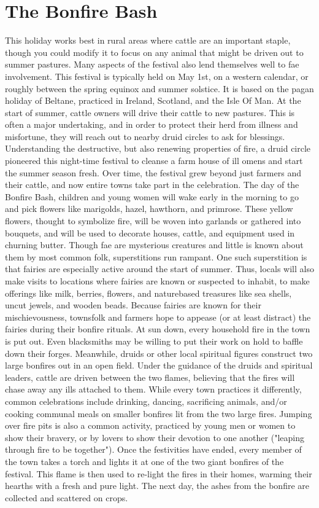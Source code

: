 \documentclass[10pt,a4paper,twoside,bg=print,twocolumn,openany,nodeprecatedcode]{dndbook}
\begin{document}
\section{The Bonfire Bash}
This holiday works best in rural areas where cattle are an important staple, though you could modify it to focus on any animal that might be driven out to summer pastures. Many aspects of the festival also lend themselves well to fae involvement. This festival is typically held on May 1st, on a western calendar, or roughly between the spring equinox and summer solstice. It is based on the pagan holiday of Beltane, practiced in Ireland, Scotland, and the Isle Of Man.
At the start of summer, cattle owners will drive their cattle to new pastures. This is often a major undertaking, and in order to protect their herd from illness and misfortune, they will reach out to nearby druid circles to ask for blessings. Understanding the destructive, but also renewing properties of fire, a druid circle pioneered this night-time festival to cleanse a farm house of ill omens and start the summer season fresh. Over time, the festival grew beyond just farmers and their cattle, and now entire towns take part in the celebration.
The day of the Bonfire Bash, children and young women will wake early in the morning to go and pick flowers like marigolds, hazel, hawthorn, and primrose. These yellow flowers, thought to symbolize fire, will be woven into garlands or gathered into bouquets, and will be used to decorate houses, cattle, and equipment used in churning butter.
Though fae are mysterious creatures and little is known about them by most common folk, superstitions run rampant. One such superstition is that fairies are especially active around the start of summer. Thus, locals will also make visits to locations where fairies are known or suspected to inhabit, to make offerings like milk, berries, flowers, and naturebased treasures like sea shells, uncut jewels, and wooden beads. Because fairies are known for their mischievousness, townsfolk and farmers hope to appease (or at least distract) the fairies during their bonfire rituals.
At sun down, every household fire in the town is put out. Even blacksmiths may be willing to put their work on hold to baffle down their forges. Meanwhile, druids or other local spiritual figures construct two large bonfires out in an open field. Under the guidance of the druids and spiritual leaders, cattle are driven between the two flames, believing that the fires will chase away any ills attached to them.
While every town practices it differently, common celebrations include drinking, dancing, sacrificing animals, and/or cooking communal meals on smaller bonfires lit from the two large fires. Jumping over fire pits is also a common activity, practiced by young men or women to show their bravery, or by lovers to show their devotion to one another ("leaping through fire to be together"). Once the festivities have ended, every member of the town takes a torch and lights it at one of the two giant bonfires of the festival. This flame is then used to re-light the fires in their homes, warming their hearths with a fresh and pure light. The next day, the ashes from the bonfire are collected and scattered on crops.
\end{document}
